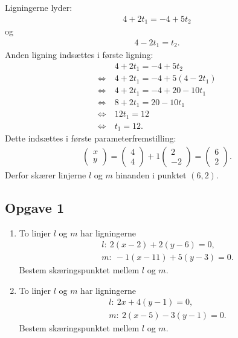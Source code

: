 \begin{exa}
	Ligningerne lyder:
	\begin{align*}
		4 + 2t_1 = -4+5t_2
	\end{align*} og
	\begin{align*}
		4-2t_1 = t_2.
	\end{align*}
	Anden ligning indsættes i første ligning:
	\begin{align*}
		&4 + 2t_1 = -4+5t_2\\
		\Leftrightarrow \ &4 + 2t_1 = -4+5(4-2t_1)\\
		\Leftrightarrow \ &4+2t_1 = -4+20-10t_1\\
		\Leftrightarrow \ &8+2t_1 = 20-10t_1\\
		\Leftrightarrow \ &12t_1 = 12\\
		\Leftrightarrow \ &t_1 = 12.
	\end{align*}
	Dette indsættes i første parameterfremstilling:
	\begin{align*}
		\begin{pmatrix}
			x \\ y
		\end{pmatrix} = 
		\begin{pmatrix}
			4 \\ 4 
		\end{pmatrix} 
		+ 1
		\begin{pmatrix}
			2 \\ -2
		\end{pmatrix} = 
		\begin{pmatrix}
			6 \\ 2
		\end{pmatrix}.
	\end{align*}
	Derfor skærer linjerne $l$ og $m$ hinanden i punktet $(6,2)$. 
\end{exa}

\subsection*{Opgave 1}
\begin{enumerate}[label=\roman*)]
	\item To linjer $l$ og $m$ har ligningerne
	\begin{align*}
		&l: \ 2(x-2) + 2(y-6) = 0,\\
		&m: \ -1(x-11) + 5(y-3) = 0.
	\end{align*}
	Bestem skæringspunktet mellem $l$ og $m$. 
	\item To linjer $l$ og $m$ har ligningerne 
	\begin{align*}
		&l: \ 2x + 4(y-1) = 0,\\
		&m: \ 2(x-5) -3(y-1) = 0.
	\end{align*}
	Bestem skæringspunktet mellem $l$ og $m$.
\end{enumerate}

